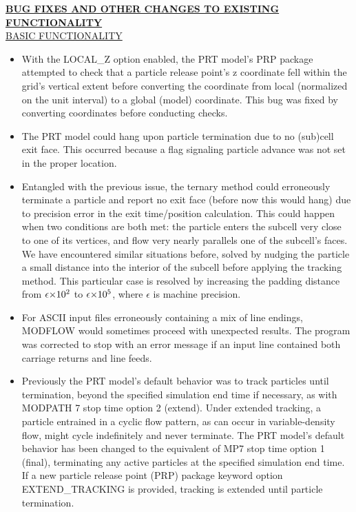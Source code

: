 \textbf{\underline{BUG FIXES AND OTHER CHANGES TO EXISTING FUNCTIONALITY}} \\
\underline{BASIC FUNCTIONALITY}
\begin{itemize}
    \item With the LOCAL\_Z option enabled, the PRT model's PRP package attempted to check that a particle release point's z coordinate fell within the grid's vertical extent before converting the coordinate from local (normalized on the unit interval) to a global (model) coordinate. This bug was fixed by converting coordinates before conducting checks.
    \item The PRT model could hang upon particle termination due to no (sub)cell exit face. This occurred because a flag signaling particle advance was not set in the proper location.
    \item Entangled with the previous issue, the ternary method could erroneously terminate a particle and report no exit face (before now this would hang) due to precision error in the exit time/position calculation. This could happen when two conditions are both met: the particle enters the subcell very close to one of its vertices, and flow very nearly parallels one of the subcell's faces. We have encountered similar situations before, solved by nudging the particle a small distance into the interior of the subcell before applying the tracking method. This particular case is resolved by increasing the padding distance from $\sisetup{input-digits = 0123456789\epsilon} \num{\epsilon e+2}$ to $\sisetup{input-digits = 0123456789\epsilon} \num{\epsilon e+5}$, where $\epsilon$ is machine precision.
    \item For ASCII input files erroneously containing a mix of line endings, MODFLOW would sometimes proceed with unexpected results. The program was corrected to stop with an error message if an input line contained both carriage returns and line feeds.
    \item Previously the PRT model's default behavior was to track particles until termination, beyond the specified simulation end time if necessary, as with MODPATH 7 stop time option 2 (extend). Under extended tracking, a particle entrained in a cyclic flow pattern, as can occur in variable-density flow, might cycle indefinitely and never terminate. The PRT model's default behavior has been changed to the equivalent of MP7 stop time option 1 (final), terminating any active particles at the specified simulation end time. If a new particle release point (PRP) package keyword option EXTEND\_TRACKING is provided, tracking is extended until particle termination.

\end{itemize}
